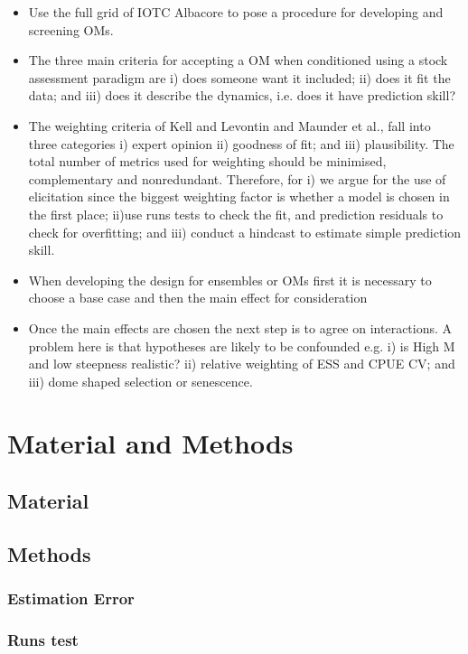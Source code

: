 \documentclass[a4paper]{article}
\begin{document}
\begin{itemize}
    \item Use the full grid of IOTC Albacore to pose a procedure for developing and screening OMs.
    \item The three main criteria for accepting a OM when conditioned using a stock assessment paradigm are i) does someone want it included; ii) does it fit the data; and iii) does it describe the dynamics, i.e. does it have prediction skill?
    \item The weighting criteria of Kell and Levontin and Maunder et al., fall into three categories i) expert opinion ii) goodness of fit; and iii) plausibility. The total number of metrics used for weighting should be minimised, complementary and nonredundant. Therefore, for i) we argue for the use of elicitation since the biggest weighting factor is whether a model is chosen in the first place; ii)use runs tests to check the fit, and prediction residuals to check for overfitting; and  iii) conduct a hindcast to estimate simple prediction skill. 
    \item When developing the design for ensembles or OMs first it is necessary to choose a base case and then the main effect for consideration
    \item Once the main effects are chosen the next step is to agree on interactions. A problem here is that hypotheses are likely to be confounded e.g. i) is High M and low steepness realistic? ii) relative weighting of ESS and CPUE CV; and iii) dome shaped selection or senescence.
\end{itemize}

\newpage
\section*{Material and Methods}
\subsection*{Material}
\subsection*{Methods}
\subsubsection*{Estimation Error}
\subsubsection*{Runs test}
\end{document}
